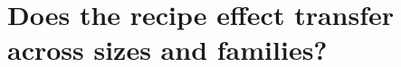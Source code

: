 \documentclass[11pt]{article}
\begin{document}
\section{Does the recipe effect transfer across sizes and families?}
\label{sec:transfer}
\end{document}
